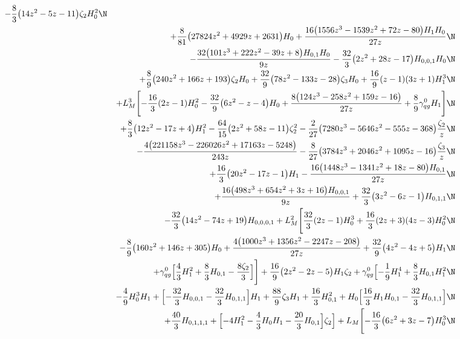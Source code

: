 \begin{eqnarray}
-\frac{8}{3} \big(14 z^2-5 z-11\big) \zeta_2 H_0^2
\N\\&&
+\frac{8}{81} \big(27824 z^2+4929 z+2631\big) H_0
+\frac{16 \big(1556 z^3-1539 z^2+72 z-80\big) H_1 H_0}{27 z}
\N\\&&
-\frac{32 \big(101 z^3+222 z^2-39 z+8\big) H_{0,1} H_0}{9 z}
-\frac{32}{3} \big(2 z^2+28 z-17\big) H_{0,0,1} H_0
\N\\&&
+\frac{8}{9} \big(240 z^2+166 z+193\big) \zeta_2 H_0
+\frac{32}{9} \big(78 z^2-133 z-28\big) \zeta_3 H_0
+\frac{16}{9} (z-1) (3 z+1) H_1^3
\N\\&&
+ L_M^3 \Biggl[
-\frac{16}{3} (2 z-1) H_0^2
-\frac{32}{9} \big(6 z^2-z-4\big) H_0
+\frac{8 \big(124 z^3-258 z^2+159 z-16\big)}{27 z}
+\frac{8}{9} {\gamma}_{qg}^{0} H_1\Biggr]
\N\\&&
+\frac{8}{3} \big(12 z^2-17 z+4\big) H_1^2
-\frac{64}{15} \big(2 z^2+58 z-11\big) \zeta_2^2
-\frac{2}{27} \big(7280 z^3-5646 z^2-555 z-368\big) \frac{\zeta_2}{z}
\N\\&&
-\frac{4 \big(221158 z^3-226026 z^2+17163 z-5248\big)}{243 z}
-\frac{8}{27} \big(3784 z^3+2046 z^2+1095 z-16\big) \frac{\zeta_3}{z}
\N\\&&
+\frac{16}{3} \big(20 z^2-17 z-1\big) H_1
-\frac{16 \big(1448 z^3-1341 z^2+18 z-80\big) H_{0,1}}{27 z}
\N\\&&
+\frac{16 \big(498 z^3+654 z^2+3 z+16\big) H_{0,0,1}}{9 z}
+\frac{32}{3} \big(3 z^2-6 z-1\big) H_{0,1,1}
\N\\&&
-\frac{32}{3} \big(14 z^2-74 z+19\big) H_{0,0,0,1}
+L_M^2 \Biggl[
\frac{32}{3} (2 z-1) H_0^3
+\frac{16}{3} (2 z+3) (4 z-3) H_0^2
\N\\&&
-\frac{8}{9} \big(160 z^2+146 z+305\big) H_0
+\frac{4 \big(1000 z^3+1356 z^2-2247 z-208\big)}{27 z}
+\frac{32}{9} \big(4 z^2-4 z+5\big) H_1
\N\\&&
+{\gamma}_{qg}^{0} \Bigl[
\frac{4}{3} H_1^2
+\frac{8}{3} H_{0,1}
-\frac{8 \zeta_2}{3}\Bigr]\Biggr]
+\frac{16}{9} \big(2 z^2-2 z-5\big) H_1 \zeta_2
+{\gamma}_{qg}^{0} \Bigl[
-\frac{1}{9} H_1^4
+\frac{8}{3} H_{0,1} H_1^2
\N\\&&
-\frac{4}{9} H_0^3 H_1+\Bigl[
-\frac{32}{3} H_{0,0,1}
-\frac{32}{3} H_{0,1,1}\Bigr] H_1
+\frac{88}{9} \zeta_3 H_1
+\frac{16}{3} H_{0,1}^2
+H_0 \Bigl[
\frac{16}{3} H_1 H_{0,1}
-\frac{32}{3} H_{0,1,1}\Bigr]
\N\\&&
+\frac{40}{3} H_{0,1,1,1}+\Bigl[-4 H_1^2
-\frac{4}{3} H_0 H_1
-\frac{20}{3} H_{0,1}\Bigr] \zeta_2\Bigr]
+L_M \Biggl[
-\frac{16}{3} \big(6 z^2+3 z-7\big) H_0^3
\N\\&&

\end{eqnarray}
